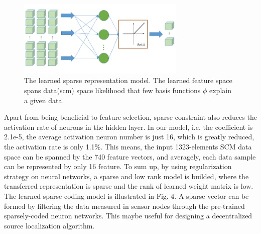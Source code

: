 \begin{figure}
\includegraphics[width=8cm]{figure/sparse_represention_model}
\caption{The learned sparse representation model. The learned feature space spans data(scm) space likelihood that few basis functions $\phi$ explain a given data.}
\end{figure}
Apart from being beneficial to feature selection, sparse constraint also reduces the activation rate of neurons in the hidden layer. In our model, i.e. the coefficient is 2.1e-5, the average activation neuron number is just 16, which is greatly reduced, the activation rate is only 1.1{\%}.
This means, the input 1323-elements SCM data space can be spanned by the 740 feature vectors, and averagely, each data sample can be represented by only 16 feature. To sum up, by using regularization strategy on neural networks, a sparse and low rank model is builded, where the transferred representation is sparse and the rank of learned weight matrix is low. The learned sparse coding model is illustrated in Fig. 4.
A sparse vector can be formed by filtering the data measured in sensor nodes through the pre-trained sparsely-coded neuron networks.
This maybe useful for designing a decentralized source localization algorithm.%
